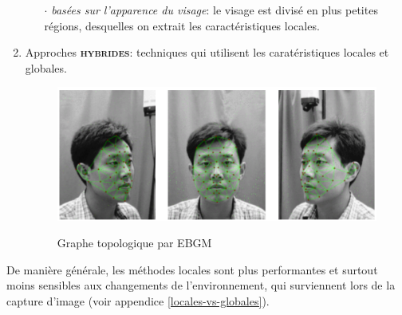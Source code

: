 \begin{enumerate}
\begin{itemize}
	\item[$\cdot$] \textit{basées sur l'apparence du visage}: le visage est divisé en plus petites régions, desquelles on extrait les caractéristiques locales.
	\end{itemize}
\item Approches \textsc{\textbf{hybrides}}: techniques qui utilisent les caratéristiques locales et globales.
	\begin{figure}[h!]
	\center\includegraphics[scale=.3]{images/ebgm}\label{graphe-topo}
	\caption{Graphe topologique par EBGM \cite{Ximage_1}}
	\end{figure}
\end{enumerate}

De manière générale, les méthodes locales sont plus performantes et surtout moins sensibles aux changements de l'environnement, qui surviennent lors de la capture d'image (voir appendice \ref{locales-vs-globales}).



